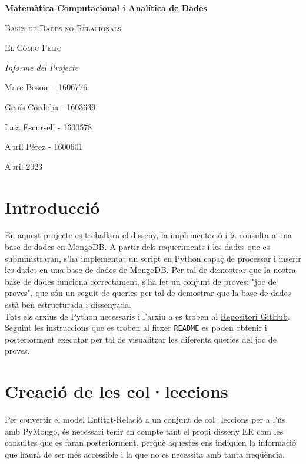 \documentclass{article}
\begin{document}
\begin{titlepage}
	\centering
	\vspace*{1cm}
	{\bfseries\Large Matem\`atica Computacional i Anal\'itica de Dades \par}
	\vspace{0.5cm}
	{\scshape\Large Bases de Dades no Relacionals \par}
	\vspace{6cm}
	{\scshape\Huge El C\`omic Feliç \par}
	\vspace{0.5cm}
	{\itshape\Large Informe del Projecte \par}
	\vfill
	\vfill
	{\Large Marc Bosom - 1606776 \par}
	{\Large Gen\'is C\'ordoba - 1603639 \par}
	{\Large Laia Escursell - 1600578 \par}
	{\Large Abril P\'erez - 1600601 \par}
	\vfill
	{\Large Abril 2023}
\end{titlepage}

\section{Introducció}
En aquest projecte es treballarà el disseny, la implementació i la consulta a una base de dades en MongoDB. A partir dels requeriments 
i les dades que es subministraran, s’ha implementat un script en Python capaç de processar i inserir les dades en una base de dades de 
MongoDB. Per tal de demostrar que la nostra base de dades funciona correctament, s'ha fet un conjunt de proves: "joc de proves", que són un seguit de queries per tal de demostrar que la base de dades està ben estructurada i dissenyada. \\

Tots els arxius de Python necessaris i l'arxiu a es troben al \href{https://github.com/genisgui/MongoDB-comics.git}{Repositori GitHub}. Seguint les instruccions que es troben al fitxer \texttt{README} es poden obtenir i posteriorment executar per tal de visualitzar les diferents queries del joc de proves.


\section{Creaci\'o de les col·leccions}
Per convertir el model Entitat-Relació a un conjunt de col·leccions per a l'ús amb PyMongo, és necessari tenir en compte tant el propi disseny ER com les consultes que es faran posteriorment, perqu\`e aquestes ens indiquen la informaci\'o que haur\`a de ser m\'es accessible i la que no es necessita amb tanta freq\"u\`encia.\\
\end{document}
